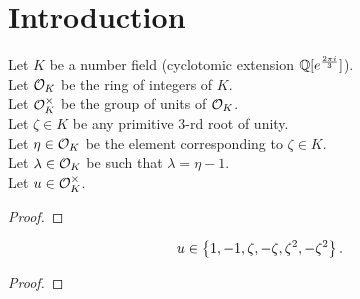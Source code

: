 \chapter*{Introduction}



Let $K$ be a number field (cyclotomic extension $\mathbb{Q}[e^{\frac{2\pi i}{3}}]$). \\
Let $\mathcal{O}_K$ be the ring of integers of $K$. \\
Let $\mathcal{O}^\times_K$ be the group of units of $\mathcal{O}_K$. \\
Let $\zeta \in K$ be any primitive $3$-rd root of unity. \\
Let $\eta \in \mathcal{O}_K$ be the element corresponding to $\zeta \in K$. \\
Let $\lambda \in \mathcal{O}_K$ be such that $\lambda = \eta -1$. \\
Let $u \in \mathcal{O}^\times_K$.

\begin{lemma}
    \label{lmm:fermatLastTheoremWith_of_fermatLastTheoremWith_coprime}
    \leanok
\end{lemma}
\begin{proof}
    \leanok
\end{proof}

\begin{theorem}
    \label{thm:mem}
    \leanok
    $$u \in \left\{1, -1, \zeta, -\zeta, \zeta^2, -\zeta^2\right\}.$$
\end{theorem}
\begin{proof}
    \leanok
\end{proof}

